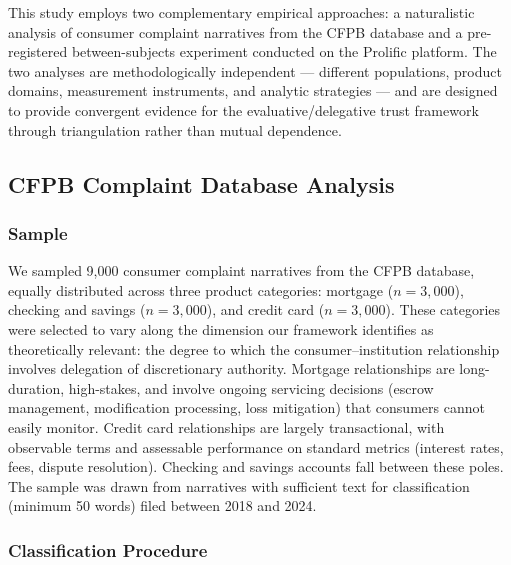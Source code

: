 
This study employs two complementary empirical approaches: a naturalistic analysis of consumer complaint narratives from the CFPB database and a pre-registered between-subjects experiment conducted on the Prolific platform. The two analyses are methodologically independent --- different populations, product domains, measurement instruments, and analytic strategies --- and are designed to provide convergent evidence for the evaluative/delegative trust framework through triangulation rather than mutual dependence.

\subsection{CFPB Complaint Database Analysis}
\label{sec:methods_cfpb}

\subsubsection{Sample}

We sampled 9,000 consumer complaint narratives from the CFPB database, equally distributed across three product categories: mortgage ($n = 3{,}000$), checking and savings ($n = 3{,}000$), and credit card ($n = 3{,}000$). These categories were selected to vary along the dimension our framework identifies as theoretically relevant: the degree to which the consumer--institution relationship involves delegation of discretionary authority. Mortgage relationships are long-duration, high-stakes, and involve ongoing servicing decisions (escrow management, modification processing, loss mitigation) that consumers cannot easily monitor. Credit card relationships are largely transactional, with observable terms and assessable performance on standard metrics (interest rates, fees, dispute resolution). Checking and savings accounts fall between these poles. The sample was drawn from narratives with sufficient text for classification (minimum 50 words) filed between 2018 and 2024.

\subsubsection{Classification Procedure}

